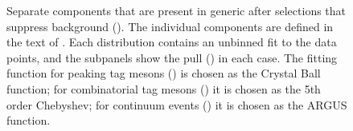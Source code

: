 \begin{figure}[htbp!]
    \centering
    \caption{\label{fig:tag_component_fits} Separate components that are present in generic \MC after selections that suppress background ().
    The individual components are defined in the text of .
    Each distribution contains an unbinned fit to the data points, and the subpanels show the pull () in each case.
    The fitting function for peaking tag \B mesons () is chosen as the Crystal Ball function;
    for combinatorial tag \B mesons () it is chosen as the 5th order Chebyshev;
    for continuum \epem\ra\qqbar events () it is chosen as the ARGUS function.
    }
\end{figure}

